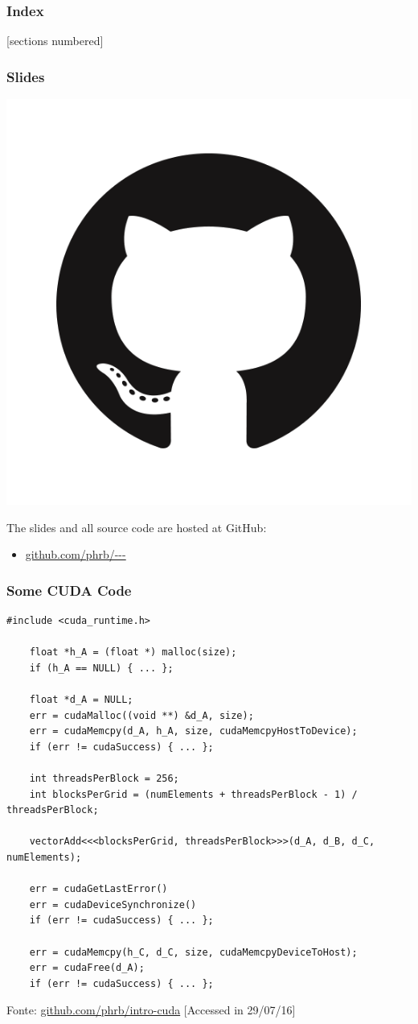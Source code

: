 \documentclass[10pt, compress, aspectratio=169]{beamer}
\begin{document}
\begin{frame}
    \frametitle{Index}
    [sections numbered]
    \tableofcontents[hideallsubsections, part=1]
\end{frame}

\begin{frame}
    \frametitle{Slides}
    \begin{center}
        \includegraphics[width=.18\textwidth]{github}
    \end{center}
    The slides and all source code are hosted at \alert{GitHub}:

    \begin{itemize}
        \item \url{github.com/phrb/---}
    \end{itemize}
\end{frame}

\begin{frame}[fragile]
    \frametitle{Some CUDA Code}
    \begin{lstlisting}[basicstyle=\ttfamily\scriptsize]
    #include <cuda_runtime.h>

    float *h_A = (float *) malloc(size);
    if (h_A == NULL) { ... };

    float *d_A = NULL;
    err = cudaMalloc((void **) &d_A, size);
    err = cudaMemcpy(d_A, h_A, size, cudaMemcpyHostToDevice);
    if (err != cudaSuccess) { ... };

    int threadsPerBlock = 256;
    int blocksPerGrid = (numElements + threadsPerBlock - 1) / threadsPerBlock;

    vectorAdd<<<blocksPerGrid, threadsPerBlock>>>(d_A, d_B, d_C, numElements);

    err = cudaGetLastError()
    err = cudaDeviceSynchronize()
    if (err != cudaSuccess) { ... };

    err = cudaMemcpy(h_C, d_C, size, cudaMemcpyDeviceToHost);
    err = cudaFree(d_A);
    if (err != cudaSuccess) { ... };
    \end{lstlisting}

    \vfill

    \begin{center}
        \tiny{Fonte: \url{github.com/phrb/intro-cuda} [Accessed in 29/07/16]}
    \end{center}
\end{frame}

\maketitle
\end{document}
